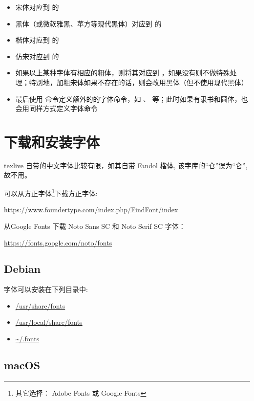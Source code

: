 \begin{itemize}
  \item 宋体对应到 \texttt{\rmfamily} 的 \texttt{\upshape}
  \item 黑体（或微软雅黑、苹方等现代黑体）对应到 \texttt{\sffamily} 的 \texttt{\upshape}
  \item 楷体对应到 \texttt{\rmfamily} 的 \texttt{\itshape}
  \item 仿宋对应到 \texttt{\ttfamily} 的 \texttt{\upshape}
  \item 如果以上某种字体有相应的粗体，则将其对应到 \texttt{\bfseries}，如果没有则不做特殊处理；特别地，加粗宋体如果不存在的话，则会改用黑体（但不使用现代黑体）
  \item 最后使用 \texttt{\setCJKfamilyfont} 命令定义额外的的字体命令，如 \texttt{\songti}、\texttt{\heiti} 等；此时如果有隶书和圆体，也会用同样方式定义字体命令
\end{itemize}

\section{下载和安装字体}

texlive 自带的中文字体比较有限，如其自带 Fandol 楷体, 该字库的“仓”误为“仑”, 故不用。

可以从方正字体\footnote{其它选择： Adobe Fonts 或 Google Fonts}下载方正字体:

\url{https://www.foundertype.com/index.php/FindFont/index}

从Google Fonts 下载 Noto Sans SC 和 Noto Serif SC 字体：

\url{https://fonts.google.com/noto/fonts}

\subsection{Debian}

字体可以安装在下列目录中:

\begin{itemize}
  \item \url{/usr/share/fonts}
  \item \url{/usr/local/share/fonts}
  \item \url{~/.fonts}
\end{itemize}

\subsection{macOS}

